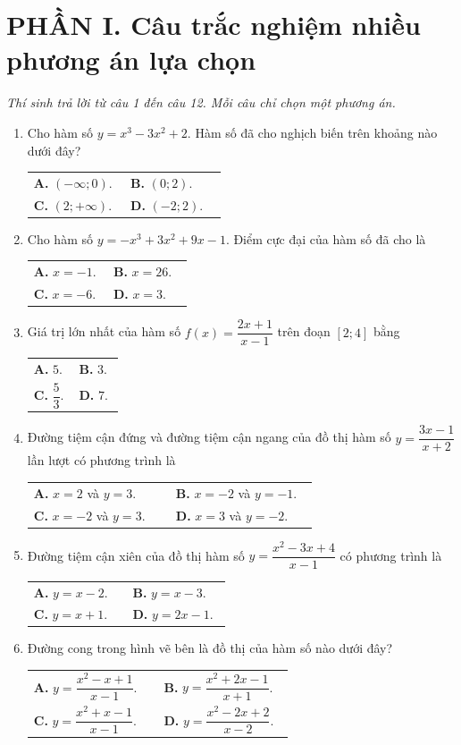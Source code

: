\documentclass[12pt,a4paper]{article}
\makeatletter
\newcommand{\bonpa}[4]{\par\nobreak\smallskip\nobreak\noindent
\begin{tabular}{@{}p{0.47\linewidth}p{0.47\linewidth}@{}}
\textbf{A.} #1 & \textbf{B.} #2\\[8pt]
\textbf{C.} #3 & \textbf{D.} #4\end{tabular}}
\makeatother
\begin{document}
\section*{\large PHẦN I. Câu trắc nghiệm nhiều phương án lựa chọn}
\textit{Thí sinh trả lời từ câu 1 đến câu 12. Mỗi câu chỉ chọn một phương án.}
\begin{enumerate}
\item Cho hàm số $y=x^3-3x^2+2$. Hàm số đã cho nghịch biến trên khoảng nào dưới đây?
\bonpa{$(-\infty;0)$.}{$(0;2)$.}{$(2;+\infty)$.}{$(-2;2)$.}

\item Cho hàm số $y=-x^3+3x^2+9x-1$. Điểm cực đại của hàm số đã cho là
\bonpa{$x=-1$.}{$x=26$.}{$x=-6$.}{$x=3$.}

\item Giá trị lớn nhất của hàm số $f(x)=\dfrac{2x+1}{x-1}$ trên đoạn $[2;4]$ bằng
\bonpa{$5$.}{$3$.}{$\dfrac{5}{3}$.}{$7$.}

\item Đường tiệm cận đứng và đường tiệm cận ngang của đồ thị hàm số $y=\dfrac{3x-1}{x+2}$ lần lượt có phương trình là
\bonpa{$x=2$ và $y=3$.}{$x=-2$ và $y=-1$.}{$x=-2$ và $y=3$.}{$x=3$ và $y=-2$.}

\item Đường tiệm cận xiên của đồ thị hàm số $y=\dfrac{x^2-3x+4}{x-1}$ có phương trình là
\bonpa{$y=x-2$.}{$y=x-3$.}{$y=x+1$.}{$y=2x-1$.}

\item Đường cong trong hình vẽ bên là đồ thị của hàm số nào dưới đây?
\par\nobreak\smallskip
\begin{minipage}[c]{0.62\linewidth}
\bonpa{$y=\dfrac{x^2-x+1}{x-1}$.}{$y=\dfrac{x^2+2x-1}{x+1}$.}{$y=\dfrac{x^2+x-1}{x-1}$.}{$y=\dfrac{x^2-2x+2}{x-2}$.}
\end{minipage}\hfill
\begin{minipage}[c]{0.36\linewidth}\centering
{}
\end{minipage}
\end{enumerate}
\end{document}

